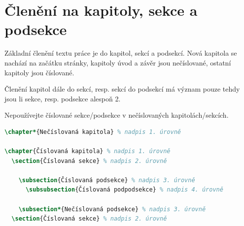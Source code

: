 \section{Členění na kapitoly, sekce a podsekce}

Základní členění textu práce je do kapitol, sekcí a podsekcí. Nová kapitola se nachází na začátku stránky, kapitoly úvod a závěr jsou nečíslované, ostatní kapitoly jsou číslované.

\begin{note}
Členění kapitol dále do sekcí, resp. sekcí do podsekcí má význam pouze tehdy jsou li sekce, resp. podsekce alespoň 2.
\end{note}

\begin{note}
Nepoužívejte číslované sekce/podsekce v nečíslovaných kapitolách/sekcích.
\end{note}

\begin{lstlisting}[caption={Příklad členění textu na kapitoly, sekce a podsekce},label=list:8-6,captionpos=t,abovecaptionskip=-\medskipamount,belowcaptionskip=\medskipamount,language=TeX]
\chapter*{Nečíslovaná kapitola} % nadpis 1. úrovně

\chapter{Číslovaná kapitola} % nadpis 1. úrovně
  \section{Číslovaná sekce} % nadpis 2. úrovně
    
    \subsection{Číslovaná podsekce} % nadpis 3. úrovně
      \subsubsection{Číslovaná podpodsekce} % nadpis 4. úrovně
      
    \subsection*{Nečíslovaná podsekce} % nadpis 3. úrovně
  \section{Číslovaná sekce} % nadpis 2. úrovně
\end{lstlisting}

